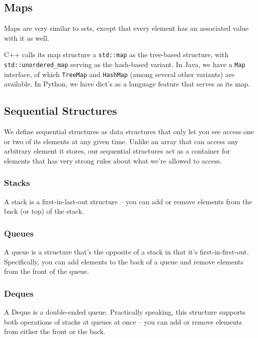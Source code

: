 \subsection{Maps}

Maps are very similar to sets, except that every element has an associated value with it as well.

C++ calls its map structure a \texttt{std::map} as the tree-based structure, with \texttt{std::unordered_map} serving as the hash-based variant. In Java, we have a \texttt{Map} interface, of which \texttt{TreeMap} and \texttt{HashMap} (among several other variants) are available. In Python, we have dict's as a language feature that serves as its map.

\subsection{Sequential Structures}

We define sequential structures as data structures that only let you see access one or two of its elements at any given time. Unlike an array that can access any arbitrary element it stores, our sequential structures act as a container for elements that has very strong rules about what we're allowed to access.

\subsubsection{Stacks}

A stack is a first-in-last-out structure -- you can add or remove elements from the back (or top) of the stack.

\subsubsection{Queues}

A queue is a structure that's the opposite of a stack in that it's first-in-first-out. Specifically, you can add elements to the back of a queue and remove elements from the front of the queue.

\subsubsection{Deques}

A Deque is a double-ended queue. Practically speaking, this structure supports both operations of stacks at queues at once -- you can add or remove elements from either the front or the back.

